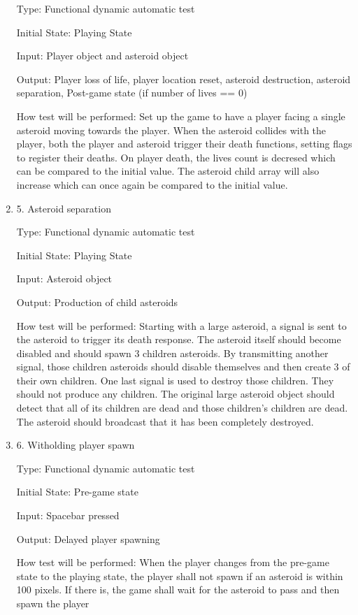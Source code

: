 \documentclass[12pt, titlepage]{article}
\begin{document}
\begin{enumerate}
Type: Functional dynamic automatic test

Initial State: Playing State

Input: Player object and asteroid object

Output: Player loss of life, player location reset, asteroid destruction, asteroid separation, Post-game state (if number of lives == 0)

How test will be performed: Set up the game to have a player facing a single asteroid moving towards the player. When the asteroid collides with the player, both the player and asteroid trigger their death functions, setting flags to register their deaths. On player death, the lives count is decresed which can be compared to the initial value. The asteroid child array will also increase which can once again be compared to the initial value.

\item{5. Asteroid separation\\}

Type: Functional dynamic automatic test

Initial State: Playing State

Input: Asteroid object

Output: Production of child asteroids

How test will be performed: Starting with a large asteroid, a signal is sent to the asteroid to trigger its death response. The asteroid itself should become disabled and should spawn 3 children asteroids. By transmitting another signal, those children asteroids should disable themselves and then create 3 of their own children. One last signal is used to destroy those children. They should not produce any children. The original large asteroid object should detect that all of its children are dead and those children's children are dead. The asteroid should broadcast that it has been completely destroyed.

\item{6. Witholding player spawn\\}

Type: Functional dynamic automatic test

Initial State: Pre-game state

Input: Spacebar pressed

Output: Delayed player spawning

How test will be performed: When the player changes from the pre-game state to the playing state, the player shall not spawn if an asteroid is within 100 pixels. If there is, the game shall wait for the asteroid to pass and then spawn the player

\end{enumerate}
\end{document}
